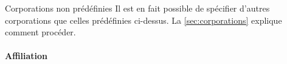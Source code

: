 %
\begin{dbremark}{Corporations non prédéfinies}{}
  Il est en fait possible de spécifier d'autres corporations que celles
  prédéfinies ci-dessus. La \vref{sec:corporations} explique comment procéder.
\end{dbremark}
%

\paragraph{Affiliation}
\label{sec:inst-de-prov}

